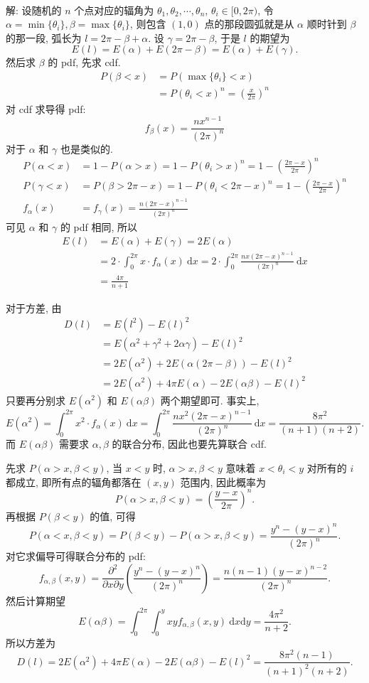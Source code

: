 ~

解: 设随机的 $n$ 个点对应的辐角为 $\theta_1, \theta_2, \cdots, \theta_n$, $\theta_i\in[0,2\pi)$, 令 $\alpha = \min\{\theta_i\}, \beta = \max\{\theta_i\}$, 则包含 $(1,0)$ 点的那段圆弧就是从 $\alpha$ 顺时针到 $\beta$ 的那一段, 弧长为 $l = 2\pi - \beta + \alpha$. 设 $\gamma = 2\pi - \beta$, 
于是 $l$ 的期望为 
\[E(l) = E(\alpha) + E(2\pi - \beta) = E(\alpha) + E(\gamma).\]
然后求 $\beta$ 的 pdf, 先求 cdf. 
\begin{align*}
P(\beta < x) &= P(\max\{\theta_i\} < x) \\
&= P(\theta_i < x)^n = \left(\frac{x}{2\pi}\right)^n 
\end{align*}
对 cdf 求导得 pdf:
\[ f_\beta(x) = \frac{nx^{n-1}}{(2\pi)^n} \]
对于 $\alpha$ 和 $\gamma$ 也是类似的.
\begin{align*}
P(\alpha < x) &= 1 - P(\alpha > x) = 1 - P(\theta_i > x)^n = 1 - \left(\frac{2\pi - x}{2\pi}\right)^n \\
P(\gamma < x) &= P(\beta > 2\pi - x) = 1 - P(\theta_i < 2\pi - x)^n = 1 - \left(\frac{2\pi - x}{2\pi}\right)^n \\
f_\alpha(x) &= f_\gamma(x) = \frac{n(2\pi-x)^{n-1}}{(2\pi)^n}
\end{align*}
可见 $\alpha$ 和 $\gamma$ 的 pdf 相同, 所以
\begin{align*}
E(l) &= E(\alpha) + E(\gamma) = 2E(\alpha) \\
&=2\cdot \int_0^{2\pi} x\cdot f_\alpha(x)\ \mathrm{d}x = 2\cdot \int_0^{2\pi} \frac{nx(2\pi - x)^{n-1}}{(2\pi)^n}\ \mathrm{d}x \\
&= \frac{4\pi}{n+1}
\end{align*}

对于方差, 由 
\begin{align*}
D(l) &= E(l^2) - E(l)^2 \\
&= E(\alpha^2 + \gamma^2 + 2\alpha\gamma) - E(l)^2 \\
&= 2E(\alpha^2) + 2E(\alpha(2\pi-\beta)) - E(l)^2 \\
&= 2E(\alpha^2) + 4\pi E(\alpha) - 2E(\alpha\beta) - E(l)^2
\end{align*}
只要再分别求 $E(\alpha^2)$ 和 $E(\alpha\beta)$ 两个期望即可. 事实上,
\[E(\alpha^2) = \int_0^{2\pi} x^2\cdot f_\alpha(x)\ \mathrm{d}x = \int_0^{2\pi} \frac{nx^2(2\pi-x)^{n-1}}{(2\pi)^{n}}\ \mathrm{d}x = \frac{8\pi^2}{(n+1)(n+2)} .\]
而 $E(\alpha\beta)$ 需要求 $\alpha,\beta$ 的联合分布, 因此也要先算联合 cdf. 

先求 $P(\alpha > x, \beta < y)$, 当 $x < y$ 时, $\alpha > x, \beta < y$ 意味着 $x < \theta_i < y$ 对所有的 $i$ 都成立, 即所有点的辐角都落在 $(x,y)$ 范围内, 因此概率为 
\[P(\alpha > x, \beta < y) = \left(\frac{y-x}{2\pi}\right)^n .\]
再根据 $P(\beta < y)$ 的值, 可得
\[P(\alpha < x, \beta < y) = P(\beta < y) - P(\alpha > x, \beta < y) = \frac{y^n - (y-x)^n}{(2\pi)^n} . \]
对它求偏导可得联合分布的 pdf:
\[f_{\alpha,\beta}(x,y) = \frac{\partial^2}{\partial x\partial y}\left(\frac{y^n - (y-x)^n}{(2\pi)^n}\right) = \frac{n(n-1)(y-x)^{n-2}}{(2\pi)^n} .\]
然后计算期望
\[E(\alpha\beta) = \int_0^{2\pi}\int_0^y xyf_{\alpha,\beta}(x,y)\ \mathrm{d}x\mathrm{d}y = \frac{4\pi^2}{n+2} .\]
所以方差为
\[D(l) = 2E(\alpha^2) + 4\pi E(\alpha) - 2E(\alpha\beta) - E(l)^2 = \frac{8\pi^2(n-1)}{(n+1)^2(n+2)} .\]


